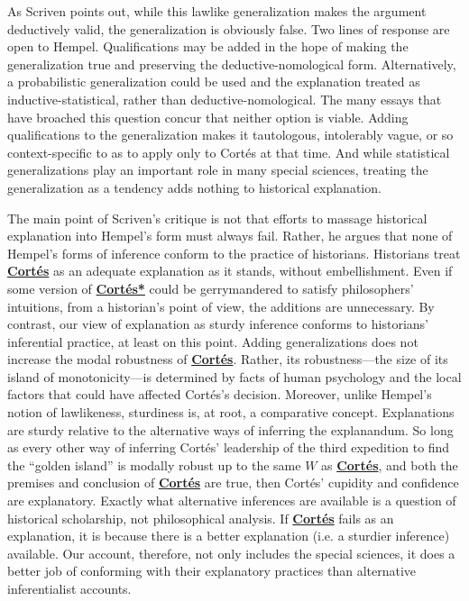 \documentclass{article}                     %
\begin{document}
\noindent As Scriven points out, while this lawlike generalization makes the argument deductively valid, the generalization is obviously false.  Two lines of response are open to Hempel.  Qualifications may be added in the hope of making the generalization true and preserving the deductive-nomological form.  Alternatively, a probabilistic generalization could be used and the explanation treated as inductive-statistical, rather than deductive-nomological.  The many essays that have broached this question concur that neither option is viable.  Adding qualifications to the generalization makes it tautologous, intolerably vague, or so context-specific to as to apply only to Cort\'{e}s at that time.  And while statistical generalizations play an important role in many special sciences, treating the generalization as a tendency adds nothing to historical explanation.

The main point of Scriven's critique is not that efforts to massage historical explanation into Hempel's form must always fail. Rather, he argues that none of Hempel's forms of inference conform to the practice of historians.  Historians treat \hyperref[Cortes]{\textbf{Cort\'{e}s}} as an adequate explanation as it stands, without embellishment.  Even if some version of \hyperref[Cortes*]{\textbf{Cort\'{e}s*}} could be gerrymandered to satisfy philosophers' intuitions, from a historian's point of view, the additions are unnecessary. By contrast, our view of explanation as sturdy inference conforms to historians' inferential practice, at least on this point.  Adding generalizations does not increase the modal robustness of \hyperref[Cortes]{\textbf{Cort\'{e}s}}.  Rather, its robustness---the size of its island of monotonicity---is determined by facts of human psychology and the local factors that could have affected Cort\'{e}s's decision.   Moreover, unlike Hempel's notion of lawlikeness, sturdiness is, at root, a comparative concept. Explanations are sturdy relative to the alternative ways of inferring the explanandum. So long as every other way of inferring Cort\'{e}s' leadership of the third expedition to find the ``golden island'' is modally robust up to the same $W$ as \hyperref[Cortes]{\textbf{Cort\'{e}s}}, and both the premises and conclusion of \hyperref[Cortes]{\textbf{Cort\'{e}s}} are true, then Cort\'{e}s' cupidity and confidence are explanatory.   Exactly what alternative inferences are available is a question of historical scholarship, not philosophical analysis.  If \hyperref[Cortes]{\textbf{Cort\'{e}s}} fails as an explanation, it is because there is a better explanation (i.e. a sturdier inference) available. Our account, therefore, not only includes the special sciences, it does a better job of conforming with their explanatory practices than alternative inferentialist accounts. 
\end{document}
